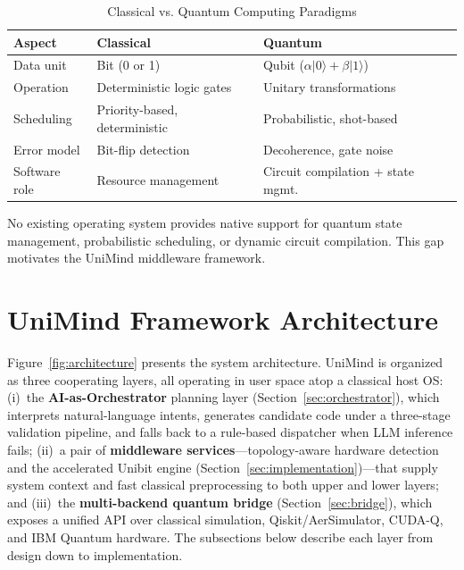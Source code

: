 ﻿\documentclass[12pt,a4paper]{article}
\begin{document}
\begin{table}[H]
\centering
\caption{Classical vs. Quantum Computing Paradigms}
\label{tab:comparison}
\small
\begin{tabular}{@{}lll@{}}
\toprule
\textbf{Aspect} & \textbf{Classical} & \textbf{Quantum} \\
\midrule
Data unit & Bit (0 or 1) & Qubit ($\alpha|0\rangle + \beta|1\rangle$) \\
Operation & Deterministic logic gates & Unitary transformations \\
Scheduling & Priority-based, deterministic & Probabilistic, shot-based \\
Error model & Bit-flip detection & Decoherence, gate noise \\
Software role & Resource management & Circuit compilation + state mgmt. \\
\bottomrule
\end{tabular}
\end{table}

No existing operating system provides native support for quantum state management, probabilistic scheduling, or dynamic circuit compilation. This gap motivates the UniMind middleware framework.


\section{UniMind Framework Architecture}\label{sec:architecture}

Figure~\ref{fig:architecture} presents the system architecture. UniMind is organized as three cooperating layers, all operating in user space atop a classical host OS: (i)~the \textbf{AI-as-Orchestrator} planning layer (Section~\ref{sec:orchestrator}), which interprets natural-language intents, generates candidate code under a three-stage validation pipeline, and falls back to a rule-based dispatcher when LLM inference fails; (ii)~a pair of \textbf{middleware services}---topology-aware hardware detection and the accelerated Unibit engine (Section~\ref{sec:implementation})---that supply system context and fast classical preprocessing to both upper and lower layers; and (iii)~the \textbf{multi-backend quantum bridge} (Section~\ref{sec:bridge}), which exposes a unified API over classical simulation, Qiskit/AerSimulator, CUDA-Q, and IBM Quantum hardware. The subsections below describe each layer from design down to implementation.
\end{document}
